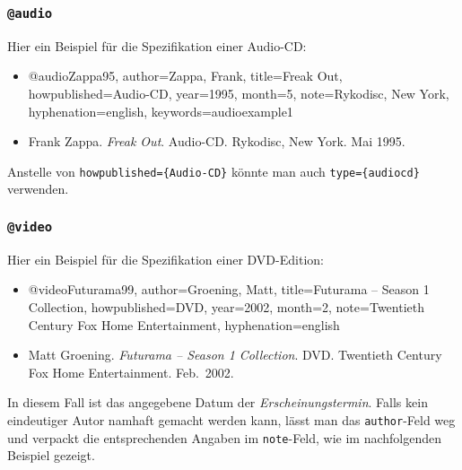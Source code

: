 \subsubsection{\texttt{@audio}}
\label{sec:@audio}
Hier ein Beispiel für die Spezifikation einer Audio-CD:
%
\begin{itemize}
\item[] 
\begin{GenericCode}[numbers=none]
@audio{Zappa95,
  author={Zappa, Frank},
  title={Freak Out},
  howpublished={Audio-CD},
  year={1995},
  month={5},
  note={Rykodisc, New York},
  hyphenation={english},
  keywords={audioexample1}
}
\end{GenericCode}
\item[\cite{Zappa95}]
Frank Zappa. \textit{Freak Out}. Audio-CD. Rykodisc, New York. Mai 1995.
\end{itemize}
%
Anstelle von \verb!howpublished={Audio-CD}! könnte man auch 
\verb!type={audiocd}! verwenden.


\subsubsection{\texttt{@video}}
\label{sec:@video}
Hier ein Beispiel für die Spezifikation einer DVD-Edition:
%
\begin{itemize}
\item[] 
\begin{GenericCode}[numbers=none]
@video{Futurama99,
  author={Groening, Matt},
  title={Futurama -- Season 1 Collection},
  howpublished={DVD},
  year={2002},
  month={2},
  note={Twentieth Century Fox Home Entertainment},
  hyphenation={english}
 }
\end{GenericCode}
\item[\cite{Futurama99}]
Matt Groening. \textit{Futurama -- Season 1 Collection}. DVD. 
Twentieth Century Fox Home Entertainment. Feb.\ 2002.
\end{itemize}
%
In diesem Fall ist das angegebene Datum der \emph{Erscheinungstermin}. 
Falls kein eindeutiger Autor namhaft gemacht werden kann, lässt man das
\texttt{author}-Feld weg und verpackt die entsprechenden Angaben im \texttt{note}-Feld, wie im nachfolgenden Beispiel gezeigt.


